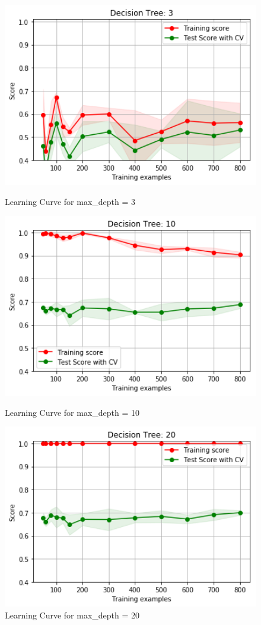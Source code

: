 \documentclass[h]{article}
\begin{document}
\begin{figure}[H]
      \includegraphics[width=1\textwidth,keepaspectratio]{2_curve_dtree3.png} 
      \caption*{Learning Curve for max\_depth = 3} 
   \endminipage\hfill
      \includegraphics[width=1\textwidth,keepaspectratio]{2_curve_dtree10.png} 
      \caption*{Learning Curve for max\_depth = 10} 
   \endminipage\hfill
      \includegraphics[width=1\textwidth,keepaspectratio]{2_curve_dtree20.png} 
      \caption*{Learning Curve for max\_depth = 20} 
   \endminipage\hfill
\end{figure}
\end{document}
